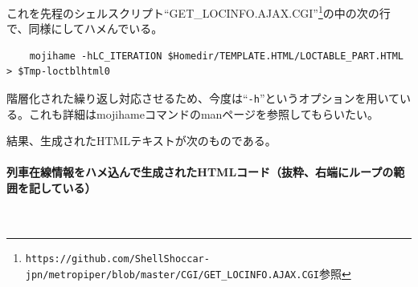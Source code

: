 これを先程のシェルスクリプト``GET\_{}LOCINFO.AJAX.CGI''\footnote{\verb|https://github.com/ShellShoccar-jpn/metropiper/blob/master/CGI/GET_LOCINFO.AJAX.CGI|参照}の中の次の行で、同様にしてハメんでいる。\\
\begin{frameboxit}{160.0mm}
\begin{verbatim}
	mojihame -hLC_ITERATION $Homedir/TEMPLATE.HTML/LOCTABLE_PART.HTML > $Tmp-loctblhtml0
\end{verbatim}
\end{frameboxit}
階層化された繰り返し対応させるため、今度は``\verb|-h|''というオプションを用いている。これも詳細はmojihameコマンドのmanページを参照してもらいたい。

結果、生成されたHTMLテキストが次のものである。
\paragraph*{列車在線情報をハメ込んで生成されたHTMLコード（抜粋、右端にループの範囲を記している）} 　\\
